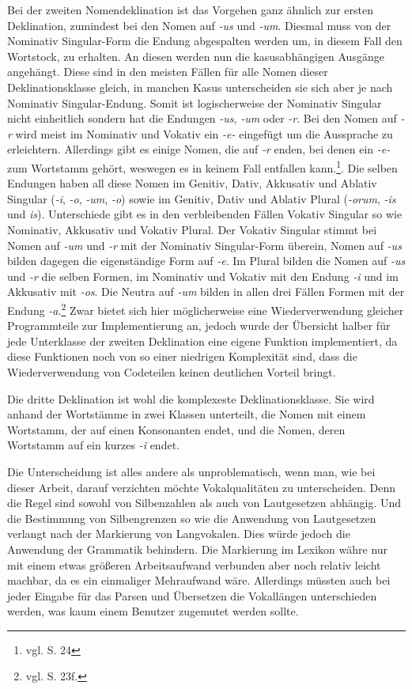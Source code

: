 \documentclass[fontsize=12pt,abstract=on,titlepage,bibliography=totoc,ngerman,listof=totoc]{scrreprt}
\begin{document}
Bei der zweiten Nomendeklination ist das Vorgehen ganz ähnlich zur ersten Deklination, zumindest bei den Nomen auf \textit{-us} und \textit{-um}. Diesmal muss von der Nominativ Singular-Form die Endung abgespalten werden um, in diesem Fall den Wortstock, zu erhalten. An diesen werden nun die kasusabhängigen Ausgänge angehängt. Diese sind in den meisten Fällen für alle Nomen dieser Deklinationsklasse gleich, in manchen Kasus unterscheiden sie sich aber je nach Nominativ Singular-Endung. Somit ist logischerweise der Nominativ Singular nicht einheitlich sondern hat die Endungen \textit{-us}, \textit{-um} oder \textit{-r}. Bei den Nomen auf \textit{-r} wird meist im Nominativ und Vokativ ein \textit{-e-} eingefügt um die Aussprache zu erleichtern. Allerdings gibt es einige Nomen, die auf \textit{-r} enden, bei denen ein \textit{-e-} zum Wortstamm gehört, weswegen es in keinem Fall entfallen kann.\footnote{vgl. \cite{BAYER-LINDAUER1994} S. 24}. Die selben Endungen haben all diese Nomen im Genitiv, Dativ, Akkusativ und Ablativ Singular (\textit{-i}, \textit{-o}, \textit{-um}, \textit{-o}) sowie im Genitiv, Dativ und Ablativ Plural (\textit{-orum}, \textit{-is} und \textit{is}). Unterschiede gibt es in den verbleibenden Fällen Vokativ Singular so wie Nominativ, Akkusativ und Vokativ Plural. Der Vokativ Singular stimmt bei Nomen auf \textit{-um} und \textit{-r} mit der Nominativ Singular-Form überein, Nomen auf \textit{-us} bilden dagegen die eigenständige Form auf \textit{-e}. Im Plural bilden die Nomen auf \textit{-us} und \textit{-r} die selben Formen, im Nominativ und Vokativ mit den Endung \textit{-i} und im Akkusativ mit \textit{-os}. Die Neutra auf \textit{-um} bilden in allen drei Fällen Formen mit der Endung \textit{-a}.\footnote{vgl. \cite{BAYER-LINDAUER1994} S. 23f.} Zwar bietet sich hier möglicherweise eine Wiederverwendung gleicher Programmteile zur Implementierung an, jedoch wurde der Übersicht halber für jede Unterklasse der zweiten Deklination eine eigene Funktion implementiert, da diese Funktionen noch von so einer niedrigen Komplexität sind, dass die Wiederverwendung von Codeteilen keinen deutlichen Vorteil bringt. \par
Die dritte Deklination ist wohl die komplexeste Deklinationsklasse. Sie wird anhand der Wortstämme in zwei Klassen unterteilt, die Nomen mit einem Wortstamm, der auf einen Konsonanten endet, und die Nomen, deren Wortstamm auf ein kurzes \textit{-ǐ} endet. \par
Die Unterscheidung ist alles andere als unproblematisch, wenn man, wie bei dieser Arbeit, darauf verzichten möchte Vokalqualitäten zu unterscheiden. Denn die Regel sind sowohl von Silbenzahlen als auch von Lautgesetzen abhängig. Und die Bestimmung von Silbengrenzen so wie die Anwendung von Lautgesetzen verlangt nach der Markierung von Langvokalen. Dies würde jedoch die Anwendung der Grammatik behindern. Die Markierung im Lexikon währe nur mit einem etwas größeren Arbeitsaufwand verbunden aber noch relativ leicht machbar, da es ein einmaliger Mehraufwand wäre. Allerdings müssten auch bei jeder Eingabe für das Parsen und Übersetzen die Vokallängen unterschieden werden, was kaum einem Benutzer zugemutet werden sollte. \par
\end{document}
